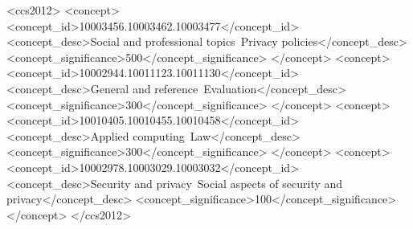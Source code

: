 \documentclass[sigconf]{acmart}
\begin{document}
\begin{abstract}


Using LLMs in healthcare, Computer-Supported Cooperative Work, and  Social Computing requires the examination of ethical and social norms to ensure safe incorporation into human life. We conducted a mixed-method study, including an online survey with 111 participants and an interview study with 38 experts, to investigate the AI ethics and social norms in ChatGPT as everyday life tools. This study aims to evaluate whether ChatGPT in an empirical context operates following ethics and social norms, which is critical for understanding actions in industrial and academic research and achieving machine ethics. The findings of this study provide initial insights into six important aspects of AI ethics, including bias, trustworthiness, security, toxicology, social norms, and ethical data. Significant obstacles related to transparency and bias in unsupervised data collection methods are identified as ChatGPT's ethical concerns.
\end{abstract}
\begin{CCSXML}
<ccs2012>
   <concept>
       <concept_id>10003456.10003462.10003477</concept_id>
       <concept_desc>Social and professional topics~Privacy policies</concept_desc>
       <concept_significance>500</concept_significance>
       </concept>
   <concept>
       <concept_id>10002944.10011123.10011130</concept_id>
       <concept_desc>General and reference~Evaluation</concept_desc>
       <concept_significance>300</concept_significance>
       </concept>
   <concept>
       <concept_id>10010405.10010455.10010458</concept_id>
       <concept_desc>Applied computing~Law</concept_desc>
       <concept_significance>300</concept_significance>
       </concept>
   <concept>
       <concept_id>10002978.10003029.10003032</concept_id>
       <concept_desc>Security and privacy~Social aspects of security and privacy</concept_desc>
       <concept_significance>100</concept_significance>
       </concept>
 </ccs2012>
\end{CCSXML}

\end{document}
